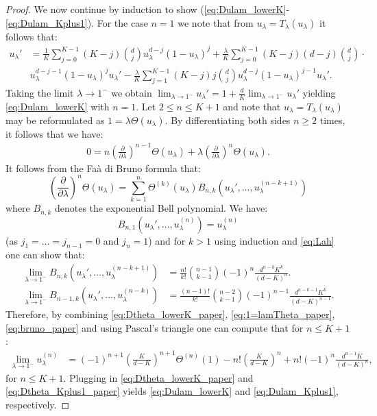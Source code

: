\documentclass[12pt]{report}
\begin{document}
\begin{proof}
We now continue by induction to show (\ref{eq:Dulam_lowerK}-\ref{eq:Dulam_Kplus1}). For the case $n=1$ we note that from $u_{\lambda}=T_\lambda(u_{\lambda})$ it follows that:
\begin{align}
u_{\lambda}' &= 
\frac{1}{K} \sum_{j=0}^{K-1} (K-j) \binom{d}{j} u_\lambda ^{d-j} (1-u_\lambda)^j + \frac{\lambda}{K} \sum_{j=0}^{K-1} (K-j) (d-j) \binom{d}{j} \cdot \nonumber\\
& u_\lambda^{d-j-1} (1-u_\lambda)^j u_\lambda' -\frac{\lambda}{K} \sum_{j=1}^{K-1} (K-j) j \binom{d}{j} u_\lambda^{d-j} (1-u_\lambda)^{j-1} u_\lambda'. \label{eq:Dulam_LLdk_paper}
\end{align}
Taking the limit $\lambda \rightarrow  1^-$ we obtain $\lim_{\lambda \rightarrow 1^-} u_{\lambda}' = 1 + \frac{d}{K} \lim_{\lambda \rightarrow 1^-} u_{\lambda}'$ yielding \eqref{eq:Dulam_lowerK} with $n=1$. Let $2 \leq n \leq K+1$ and note that $u_\lambda= T_\lambda(u_\lambda)$ may be reformulated as $1=\lambda \Theta(u_\lambda)$. By differentiating both sides $n\geq 2$ times, it follows that we have:
\begin{align}\label{eq:1=lamTheta_paper}
0= n \left( \frac{\partial}{\partial \lambda} \right)^{n-1} \Theta(u_\lambda) + \lambda \left( \frac{\partial}{\partial \lambda} \right)^{n} \Theta(u_\lambda).
\end{align}
It follows from the Fa\`a di Bruno formula that:
\begin{equation}\label{eq:bruno_paper}
\left(\frac{\partial}{\partial \lambda}\right)^n \Theta (u_\lambda)
=
\sum_{k=1}^n \Theta^{(k)}(u_\lambda) B_{n,k}(u_\lambda',\dots, u_{\lambda}^{(n-k+1)})
\end{equation}
where $B_{n,k}$ denotes the exponential Bell polynomial. We have:
$$
B_{n,1}(u_\lambda',\dots,u_\lambda^{(n)})=u_\lambda^{(n)}
$$
(as $j_1 = \ldots = j_{n-1} = 0$ and $j_n=1$) and for $k >1$ using induction and \eqref{eq:Lah} one can show that:
\begin{align*}
\lim_{\lambda \rightarrow 1^-} B_{n,k}(u_\lambda',\dots,u_{\lambda}^{(n-k+1)})
&=
\frac{n!}{k!} \binom{n-1}{k-1} (-1)^n \frac{d^{n-k} K^k}{(d-K)^n}.
\\
\lim_{\lambda \rightarrow 1^-} B_{n-1,k}(u_\lambda',\dots,u_{\lambda}^{(n-k)})
&=
\frac{(n-1)!}{k!} \binom{n-2}{k-1} (-1)^{n-1} \frac{d^{n-k-1} K^k}{(d-K)^{n-1}}.
\end{align*}
Therefore, by combining \eqref{eq:Dtheta_lowerK_paper}, \eqref{eq:1=lamTheta_paper}, \eqref{eq:bruno_paper} and using Pascal's triangle one can compute that for $n \leq K+1$:
\begin{align*}
\lim_{\lambda\rightarrow 1^-} u_\lambda^{(n)}
&=
(-1)^{n+1} \left( \frac{K}{d-K} \right)^{n+1} \Theta^{(n)}(1) -n! \left( \frac{K}{d-K} \right)^n + n! (-1)^n \frac{d^{n-1} K}{(d-K)^n},
\end{align*}
for $n \leq K+1$.
Plugging in 
 \eqref{eq:Dtheta_lowerK_paper} and \eqref{eq:Dtheta_Kplus1_paper} yields
  \eqref{eq:Dulam_lowerK} and \eqref{eq:Dulam_Kplus1}, respectively.


\end{proof}
\end{document}
